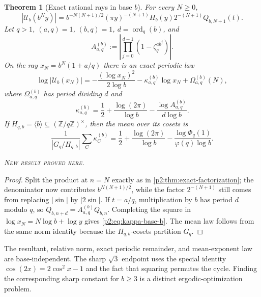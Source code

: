 \documentclass[11pt,oneside]{article}
\newtheorem{theorem}{Theorem}[section]
\theoremstyle{definition}
\theoremstyle{remark}
\newcommand{\Z}{\mathbb Z}
\newcommand{\ord}{\operatorname{ord}}
\newcommand{\newresult}{\textcolor{newgreen}{\textsc{New result proved here.}}}
\begin{document}
\begin{theorem}[Exact rational rays in base $b$]\label{p2:thm:base-b}
For every $N\ge0$,
\begin{equation}
 |\mathscr U_b(b^Ny)|
 =b^{-N(N+1)/2}(\pi y)^{-(N+1)}H_b(y)2^{-(N+1)}Q_{b,N+1}(t).
 \label{p2:eq:base-b-factorization}
\end{equation}
Let $q>1$, $(a,q)=1$, $(b,q)=1$, $d=\ord_q(b)$, and
\begin{equation}
 A_{a,q}^{(b)}:=\left|\prod_{j=0}^{d-1}
 (1-\zeta_q^{ab^j})\right|.
 \label{p2:eq:A-base-b}
\end{equation}
On the ray $x_N=b^N(1+a/q)$ there is an exact periodic law
\begin{equation}
 \log|\mathscr U_b(x_N)|
 =-\frac{(\log x_N)^2}{2\log b}
 -\kappa_{a,q}^{(b)}\log x_N+\Omega_{a,q}^{(b)}(N),
 \label{p2:eq:base-b-ray}
\end{equation}
where $\Omega_{a,q}^{(b)}$ has period dividing $d$ and
\begin{equation}
 \boxed{
 \kappa_{a,q}^{(b)}=\frac12+\frac{\log(2\pi)}{\log b}
 -\frac{\log A_{a,q}^{(b)}}{d\log b}.}
 \label{p2:eq:kappa-base-b}
\end{equation}
If $H_{q,b}=\langle b\rangle\subseteq(\Z/q\Z)^\times$, then the mean over its
cosets is
\begin{equation}
 \boxed{
 \frac1{|G_q/H_{q,b}|}\sum_C\kappa_C^{(b)}
 =\frac12+\frac{\log(2\pi)}{\log b}
 -\frac{\log\Phi_q(1)}{\varphi(q)\log b}.}
 \label{p2:eq:mean-base-b}
\end{equation}

\smallskip\noindent\newresult
\end{theorem}

\begin{proof}
Split the product at $n=N$ exactly as in \cref{p2:thm:exact-factorization}; the
denominator now contributes $b^{N(N+1)/2}$, while the factor $2^{-(N+1)}$ still
comes from replacing $|\sin|$ by $|2\sin|$. If $t=a/q$, multiplication by $b$ has
period $d$ modulo $q$, so $Q_{b,n+d}=A_{a,q}^{(b)}Q_{b,n}$. Completing the square
in $\log x_N=N\log b+\log y$ gives \eqref{p2:eq:kappa-base-b}. The mean law follows
from the same norm identity because the $H_{q,b}$-cosets partition $G_q$.
\end{proof}

\begin{remark}
The resultant, relative norm, exact periodic remainder, and mean-exponent law are
base-independent. The sharp $\sqrt3$ endpoint uses the special identity
$\cos(2x)=2\cos^2x-1$ and the fact that squaring permutes the cycle. Finding the
corresponding sharp constant for $b\ge3$ is a distinct ergodic-optimization problem.
\end{remark}
\end{document}
